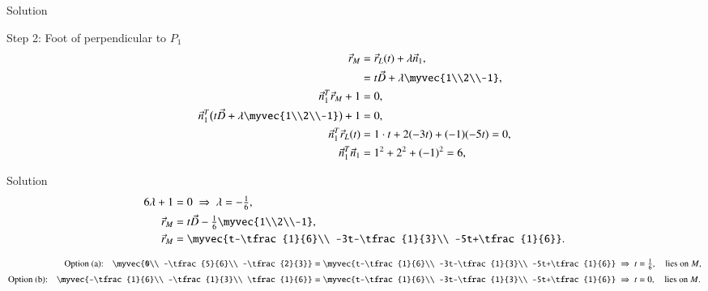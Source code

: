 \documentclass{beamer}
\begin{document}
\begin{frame}{Solution}

Step 2: Foot of perpendicular to $P_1$
\begin{align}
\vec{r}_M &= \vec{r}_L(t) + \lambda \vec{n}_1, \\
&= t \vec{D} + \lambda \myvec{1\\2\\-1}, \\
\vec{n}_1^T \vec{r}_M + 1 &= 0, \\
\vec{n}_1^T \bigl( t \vec{D} + \lambda \myvec{1\\2\\-1} \bigr) + 1 &= 0, \\
\vec{n}_1^T \vec{r}_L(t) &= 1\cdot t + 2(-3t) + (-1)(-5t) = 0, \\
\vec{n}_1^T \vec{n}_1 &= 1^2 + 2^2 + (-1)^2 = 6, \\
\end{align}
\end{frame}

\begin{frame}{Solution}
\begin{align}
6 \lambda + 1 &= 0 \;\Rightarrow\; \lambda = -\tfrac{1}{6}, \\
\vec{r}_M &= t \vec{D} - \tfrac{1}{6} \vcenter{\hbox{\myvec{1\\2\\-1}}}, \\
\vec{r}_M &= \vcenter{\hbox{\myvec{t-\tfrac{1}{6}\\ -3t-\tfrac{1}{3}\\ -5t+\tfrac{1}{6}}}}.
\end{align}

\begin{align}
\text{Option (a):} \quad 
\vcenter{\hbox{\myvec{0\\ -\tfrac{5}{6}\\ -\tfrac{2}{3}}}} 
&= \vcenter{\hbox{\myvec{t-\tfrac{1}{6}\\ -3t-\tfrac{1}{3}\\ -5t+\tfrac{1}{6}}}} 
\;\Rightarrow\; t = \tfrac{1}{6}, \quad \text{lies on $M$},\\[1mm]
\text{Option (b):} \quad
\vcenter{\hbox{\myvec{-\tfrac{1}{6}\\ -\tfrac{1}{3}\\ \tfrac{1}{6}}}} 
&= \vcenter{\hbox{\myvec{t-\tfrac{1}{6}\\ -3t-\tfrac{1}{3}\\ -5t+\tfrac{1}{6}}}} 
\;\Rightarrow\; t = 0, \quad \text{lies on $M$}.
\end{align}
\end{frame}
\end{document}
